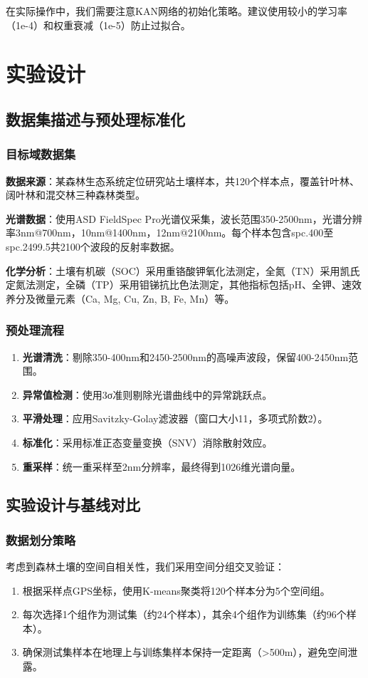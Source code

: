 \documentclass[12pt, a4paper]{article}
\begin{document}
在实际操作中，我们需要注意KAN网络的初始化策略。建议使用较小的学习率（1e-4）和权重衰减（1e-5）防止过拟合。

\newpage
\section{实验设计}

\subsection{数据集描述与预处理标准化}

\subsubsection{目标域数据集}
\textbf{数据来源}：某森林生态系统定位研究站土壤样本，共120个样本点，覆盖针叶林、阔叶林和混交林三种森林类型。

\textbf{光谱数据}：使用ASD FieldSpec Pro光谱仪采集，波长范围350-2500nm，光谱分辨率3nm@700nm，10nm@1400nm，12nm@2100nm。每个样本包含spc.400至spc.2499.5共2100个波段的反射率数据。

\textbf{化学分析}：土壤有机碳（SOC）采用重铬酸钾氧化法测定，全氮（TN）采用凯氏定氮法测定，全磷（TP）采用钼锑抗比色法测定，其他指标包括pH、全钾、速效养分及微量元素（Ca, Mg, Cu, Zn, B, Fe, Mn）等。

\subsubsection{预处理流程}
\begin{enumerate}
    \item \textbf{光谱清洗}：剔除350-400nm和2450-2500nm的高噪声波段，保留400-2450nm范围。
    \item \textbf{异常值检测}：使用3σ准则剔除光谱曲线中的异常跳跃点。
    \item \textbf{平滑处理}：应用Savitzky-Golay滤波器（窗口大小11，多项式阶数2）。
    \item \textbf{标准化}：采用标准正态变量变换（SNV）消除散射效应。
    \item \textbf{重采样}：统一重采样至2nm分辨率，最终得到1026维光谱向量。
\end{enumerate}

\subsection{实验设计与基线对比}

\subsubsection{数据划分策略}
考虑到森林土壤的空间自相关性，我们采用空间分组交叉验证：
\begin{enumerate}
    \item 根据采样点GPS坐标，使用K-means聚类将120个样本分为5个空间组。
    \item 每次选择1个组作为测试集（约24个样本），其余4个组作为训练集（约96个样本）。
    \item 确保测试集样本在地理上与训练集样本保持一定距离（>500m），避免空间泄露。
\end{enumerate}
\end{document}
